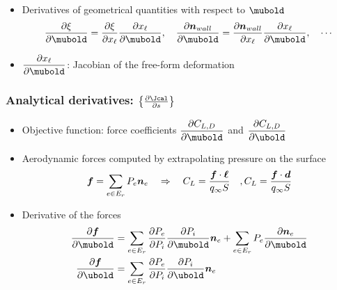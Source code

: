 \begin{frame}
\begin{itemize}
\begin{columns}[t]
\begin{figure}[!ht]
        \end{figure}
      \end{columns}\vspace{-4mm}
    \item Derivatives of geometrical quantities with respect to $\mubold$
      \begin{equation*}
        \frac{\partial \xi}{\partial \mubold} = 
        \frac{\partial \xi}{\partial x_\ell} \frac{\partial x_\ell}{\partial \mubold}, 
        \quad 
        \frac{\partial \boldsymbol{n}_{wall}}{\partial \mubold} = 
        \frac{\partial \boldsymbol{n}_{wall}}{\partial x_\ell} \frac{\partial x_\ell}{\partial \mubold},
        \quad \cdots
    \end{equation*}\vspace{-2.5mm}
    \item $\dfrac{\partial x_\ell}{\partial \mubold}$:
      Jacobian of the free-form deformation 
  \end{itemize}
\end{frame}


\begin{frame}
  \frametitle{Analytical derivatives: $\left\{\frac{\partial \Jcal}{\partial s}\right\}$}
  \begin{itemize}
  \item Objective function: force coefficients  
    $\dfrac{\partial C_{L,D}}{\partial \mubold}$ and
    $\dfrac{\partial C_{L,D}}{\partial \ubold}$
    \item Aerodynamic forces computed by extrapolating pressure on the surface
      \begin{equation*}
        \boldsymbol{f} = \sum_{e \in E_r} P_e \boldsymbol{n}_e 
        \quad \Rightarrow \quad 
        C_L = \frac{\boldsymbol{f}\cdot \boldsymbol{\ell}}{q_\infty S}
        \quad,
        C_L = \frac{\boldsymbol{f}\cdot \boldsymbol{d}}{q_\infty S}
        \vspace{-1mm}
      \end{equation*}
      \item Derivative of the forces
        \begin{equation*}
          \begin{split}
            \frac{\partial \boldsymbol{f}}{\partial \mubold} & = 
            \sum_{e \in E_r} \frac{\partial P_e}{\partial P_i} \frac{\partial P_i}{\partial \mubold} \boldsymbol{n}_e  +
            \sum_{e \in E_r} P_e\frac{\partial  \boldsymbol{n}_e }{\partial \mubold} \\
            \frac{\partial \boldsymbol{f}}{\partial \ubold} & = 
            \sum_{e \in E_r} \frac{\partial P_e}{\partial P_i} \frac{\partial P_i}{\partial \ubold} \boldsymbol{n}_e 
          \end{split}
        \end{equation*}
\end{itemize}
\end{frame}